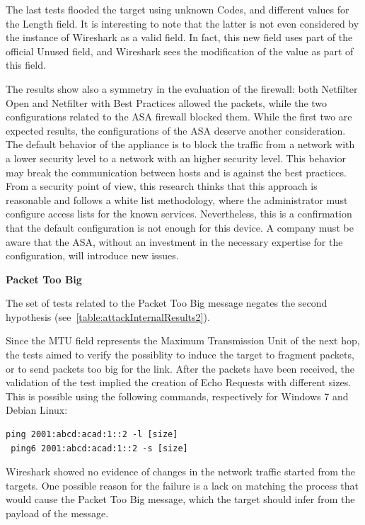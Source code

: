 \documentclass[12pt]{article}
\begin{document}
The last tests flooded the target using unknown Codes, and different values for the Length field. It is interesting to note that the latter is not even considered by the instance of Wireshark as a valid field. In fact, this new field uses part of the official Unused field, and Wireshark sees the modification of the value as part of this field.

The results show also a symmetry in the evaluation of the firewall: both Netfilter Open and Netfilter with Best Practices allowed the packets, while the two configurations related to the ASA firewall blocked them. While the first two are expected results, the configurations of the ASA deserve another consideration. The default behavior of the appliance is to block the traffic from a network with a lower security level to a network with an higher security level. This behavior may break the communication between hosts and is against the best practices. From a security point of view, this research thinks that this approach is reasonable and follows a white list methodology, where the administrator must configure access lists for the known services. Nevertheless, this is a confirmation that the default configuration is not enough for this device. A company must be aware that the ASA, without an investment in the necessary expertise for the configuration, will introduce new issues.


\textbf{Packet Too Big}

The set of tests related to the Packet Too Big message negates the second hypothesis (see~\cref{table:attackInternalResults2}).

Since the MTU field represents the Maximum Transmission Unit of the next hop, the tests aimed to verify the possiblity to induce the target to fragment packets, or to send packets too big for the link. After the packets have been received, the validation of the test implied the creation of Echo Requests with different sizes. This is possible using the following commands, respectively for Windows 7 and Debian Linux:
\begin{lstlisting}[style=python,basicstyle=\ttfamily\small]
 ping 2001:abcd:acad:1::2 -l [size]
 ping6 2001:abcd:acad:1::2 -s [size]
\end{lstlisting}
\vspace{-15pt}
Wireshark showed no evidence of changes in the network traffic started from the targets. One possible reason for the failure is a lack on matching the process that would cause the Packet Too Big message, which the target should infer from the payload of the message.
\end{document}
